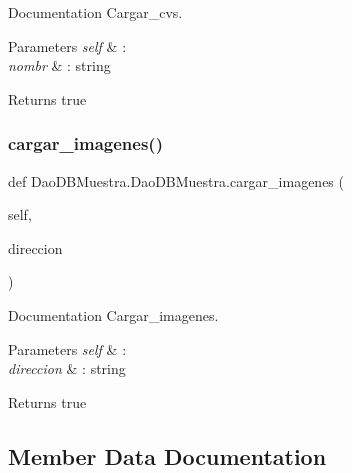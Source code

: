 Documentation Cargar\+\_\+cvs. 


\begin{DoxyParams}{Parameters}
{\em self} & \+: \\
\hline
{\em nombr} & \+: string \\
\hline
\end{DoxyParams}
\begin{DoxyReturn}{Returns}
true 
\end{DoxyReturn}
\mbox{\label{class_dao_d_b_muestra_1_1_dao_d_b_muestra_ac8915e56920d6c87dab593dff9a7bfdf}} 
\subsubsection{\texorpdfstring{cargar\+\_\+imagenes()}{cargar\_imagenes()}}
{\footnotesize\ttfamily def Dao\+D\+B\+Muestra.\+Dao\+D\+B\+Muestra.\+cargar\+\_\+imagenes (\begin{DoxyParamCaption}\item[{}]{self,  }\item[{}]{direccion }\end{DoxyParamCaption})}



Documentation Cargar\+\_\+imagenes. 


\begin{DoxyParams}{Parameters}
{\em self} & \+: \\
\hline
{\em direccion} & \+: string \\
\hline
\end{DoxyParams}
\begin{DoxyReturn}{Returns}
true 
\end{DoxyReturn}


\subsection{Member Data Documentation}
\mbox{\label{class_dao_d_b_muestra_1_1_dao_d_b_muestra_aa3ded640da73e60fd7371465deb482b6}} 
